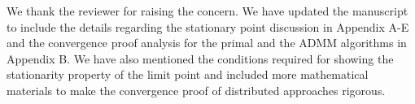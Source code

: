 \begin{enumerate}
\begin{comment}
Note that the objective sequence \eqn{\{f(\mbf{x}_k)\}} generated by an iterative \ac{SCA} algorithm is monotonic, \textit{i.e}, \eqn{f(\mbf{x}_k) \leq f(\mbf{x}_{k-1})} and holds with equality at the limit point of the iterative procedure. However, upon convergence, due to the convexity of the objective, we may have multiple limit points, say, \eqn{\mbf{y}_{\ast}} with the same objective as \eqn{f(\mbf{y}_{\ast}) = f(\mbf{x}_{\ast})}. Therefore, strict monotonicity cannot be guaranteed for the objective sequence. However, when the objective function is strongly convex with a parameter \eqn{m > 0}, as discussed in Appendix A-B, the minimizer for the subproblem in each \ac{SCA} iteration \eqn{k} is unique as
\begin{equation} \label{eqn-aa}
f(\ma_{k}) - f(\ma_{k+1}) \geq  \nabla f(\ma_{k+1})^\tran (\ma_{k} - \ma_{k+1}) + m \|\ma_{k} - \ma_{k+1}\|^2
\end{equation}
where \eqn{\ma_{k+1}} is the optimal solution for the \eqn{\ith{k}} \ac{SCA} subproblem and \eqn{\ma_{k}} is the unique minimizer obtained in the previous \eqn{\ith{k-1}} \ac{SCA} step, which is a feasible point for the current problem. Since \eqn{\ma_{k+1}} is the solution in the \eqn{\ith{k}} \ac{SCA} problem, following conditions hold
\begin{subeqnarray}
\nabla f(\ma_{k+1})^\tran (\ma_{k} - \ma_{k+1}) &\geq& 0 \slabel{eqn-a} \\
f(\ma_{k}) - f(\ma_{k+1}) &\geq& m \|\ma_{k} - \ma_{k+1}\|^2 \slabel{eqn-b}
\end{subeqnarray}
where \eqref{eqn-a} is due to the lack of any descent direction in the feasible set and \eqref{eqn-b} follows from \eqref{eqn-aa} using \eqref{eqn-a}. As \eqn{k \rightarrow \infty, \|\ma_{k+1} - \ma_{k}\| \rightarrow 0}, and therefore the iterative algorithm converges to a unique minimizer, say, \eqn{\ma_{\ast}}, which is the limit point of the algorithm. Now by using the monotonicity of the \ac{SCA} updates and the uniqueness of the minimizer in each step, we can guarantee the strict monotonicity of the objective sequence generated by the iterative problem. 
\end{comment}

 

\resp We thank the reviewer for raising the concern. We have updated the manuscript to include the details regarding the stationary point discussion in Appendix A-E and the convergence proof analysis for the primal and the \ac{ADMM} algorithms in Appendix B. We have also mentioned the conditions required for showing the stationarity property of the limit point and included more mathematical materials to make the convergence proof of distributed approaches rigorous.

\end{enumerate}
